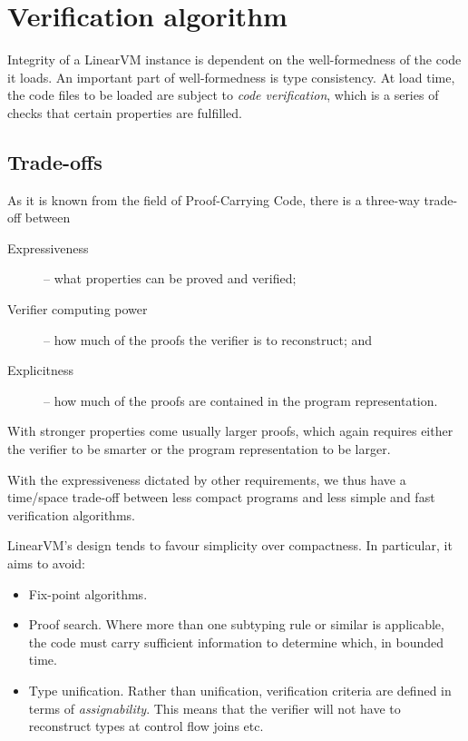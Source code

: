 \documentclass[a4paper]{report}
\begin{document}
\chapter{Verification algorithm}
\label{chap:verifier}

Integrity of a LinearVM instance is dependent on the well-formedness
of the code it loads.
An important part of well-formedness is type consistency.
At load time, the code files to be loaded are subject to \emph{code
  verification}, which is a series of checks that certain properties are fulfilled.

\section{Trade-offs}
As it is known from the field of Proof-Carrying Code, there is a
three-way trade-off between
\begin{description}
\item[Expressiveness] -- what properties can be proved and verified;
\item[Verifier computing power] -- how much of the proofs the verifier is to reconstruct; and
\item[Explicitness] -- how much of the proofs are contained in the
  program representation.
\end{description}

With stronger properties come usually larger proofs, which again
requires either the verifier to be smarter or the program
representation to be larger.

With the expressiveness dictated by other requirements, we thus have a
time/space trade-off between less compact programs and less simple and
fast verification algorithms.

LinearVM's design tends to favour simplicity over compactness.
In particular, it aims to avoid:

\begin{itemize}
\item Fix-point algorithms.
\item Proof search.
  Where more than one subtyping rule or similar is applicable, the
  code must carry sufficient information to determine which, in bounded time.
\item Type unification.
  Rather than unification, verification criteria are defined in terms of
  \emph{assignability}. This means that the verifier will not have to
  reconstruct types at control flow joins etc.

\end{itemize}
\end{document}
